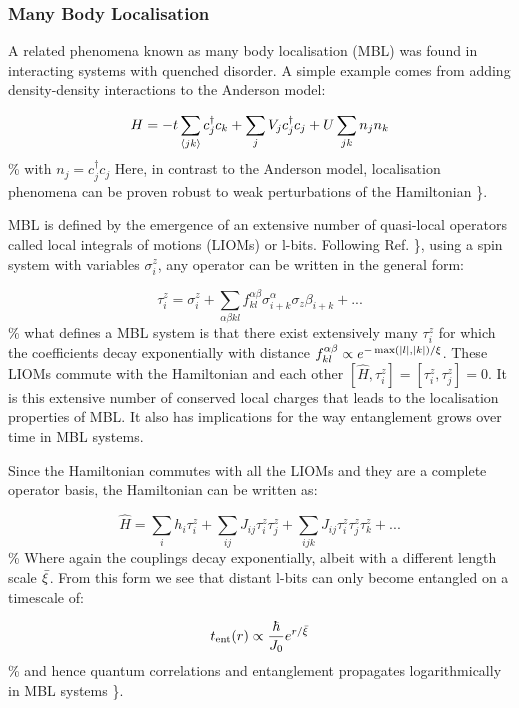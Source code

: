 \hypertarget{many-body-localisation}{%
\subsubsection{Many Body Localisation}\label{many-body-localisation}}

A related phenomena known as many body localisation (MBL) was found in
interacting systems with quenched disorder. A simple example comes from
adding density-density interactions to the Anderson model:

\[
H = -t\sum_{\langle jk \rangle} c^\dagger_j c_k + \sum_j V_j c_j^\dagger c_j + U\sum_{jk} n_j n_k
\] \% with \(n_j = c^\dagger_j c_j\) Here, in contrast to the Anderson
model, localisation phenomena can be proven robust to weak perturbations
of the Hamiltonian \textcite{imbrie_many-body_2016}\}.

MBL is defined by the emergence of an extensive number of quasi-local
operators called local integrals of motions (LIOMs) or l-bits. Following
Ref. \textcite{abanin_recent_2017}\}, using a spin system with variables
\(\sigma^z_i\), any operator can be written in the general form:

\[ \tau^z_i = \sigma^z_i + \sum_{\alpha\beta kl} f_{kl}^{\alpha\beta} \sigma^\alpha_{i+k} \sigma_z\beta_{i+k} + ...\]
\% what defines a MBL system is that there exist extensively many
\(\tau^z_i\) for which the coefficients decay exponentially with
distance
\(f_{kl}^{\alpha\beta} \propto e^{-\max(\abs{l},\abs{k}) / \xi}\). These
LIOMs commute with the Hamiltonian and each other
\([\hat{H}, \tau^z_i] = [\tau^z_i, \tau^z_j] = 0\). It is this extensive
number of conserved local charges that leads to the localisation
properties of MBL. It also has implications for the way entanglement
grows over time in MBL systems.

Since the Hamiltonian commutes with all the LIOMs and they are a
complete operator basis, the Hamiltonian can be written as:

\[\hat{H} = \sum_{i} h_i \tau^z_i + \sum_{ij} J_{ij} \tau^z_i \tau^z_j + \sum_{ijk} J_{ij} \tau^z_i \tau^z_j \tau^z_k+ ...\]
\% Where again the couplings decay exponentially, albeit with a
different length scale \(\Bar{\xi}\). From this form we see that distant
l-bits can only become entangled on a timescale of:

\[ t_{\mathrm{ent}}(r) \propto \frac{\hbar}{J_0} e^{r/\Bar{\xi}} \] \%
and hence quantum correlations and entanglement propagates
logarithmically in MBL systems \textcite{imbrie_diagonalization_2016}\}.

